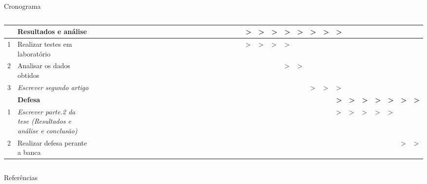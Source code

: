 \begin{frame}[c]{Cronograma}
\begin{columns}
\begin{table}[]
\begin{tabular}{llllllllllllll|llllllllllll|llllllllllll}
     & \textbf{Resultados e análise} &  &  &  &  &  &  &  &  &  &  &  &  &  &  &  &  &  &  &  &  &  &  & \textbf{\textgreater{}} & \textbf{\textgreater{}} & \textbf{\textgreater{}} & \textbf{\textgreater{}} & \textbf{\textgreater{}} & \textbf{\textgreater{}} & \textbf{\textgreater{}} & \textbf{\textgreater{}} &  &  &  &  &  &  \\ \hline
    1 & Realizar testes em laboratório &  &  &  &  &  &  &  &  &  &  &  &  &  &  &  &  &  &  &  &  &  &  & \textgreater{} & \textgreater{} & \textgreater{} & \textgreater{} &  &  &  &  &  &  &  &  &  &  \\
    2 & Analisar os dados obtidos &  &  &  &  &  &  &  &  &  &  &  &  &  &  &  &  &  &  &  &  &  &  &  &  &  & \textgreater{} & \textgreater{} &  &  &  &  &  &  &  &  &  \\
    3 & {\color[HTML]{3166FF} \textit{Escrever segundo artigo}} &  &  &  &  &  &  &  &  &  &  &  &  &  &  &  &  &  &  &  &  &  &  &  &  &  &  &  & \textgreater{} & \textgreater{} & \textgreater{} &  &  &  &  &  &  \\ \hline
     & \textbf{Defesa} &  &  &  &  &  &  &  &  &  &  &  &  &  &  &  &  &  &  &  &  &  &  &  &  &  &  &  &  &  & \textbf{\textgreater{}} & \textbf{\textgreater{}} & \textbf{\textgreater{}} & \textbf{\textgreater{}} & \textbf{\textgreater{}} & \textbf{\textgreater{}} & \textbf{\textgreater{}} \\ \hline
    1 & {\color[HTML]{3166FF} \textit{Escrever parte.2 da tese (Resultados e análise e conclusão)}} &  &  &  &  &  &  &  &  &  &  &  &  &  &  &  &  &  &  &  &  &  &  &  &  &  &  &  &  &  & \textgreater{} & \textgreater{} & \textgreater{} & \textgreater{} & \textgreater{} &  &  \\
    2 & {\color[HTML]{9A0000} Realizar defesa perante a banca} &  &  &  &  &  &  &  &  &  &  &  &  &  &  &  &  &  &  &  &  &  &  &  &  &  &  &  &  &  &  &  &  &  &  & \textgreater{} & \textgreater{}
    \end{tabular}
    \end{table}
    \end{columns}

\end{frame}
\begin{frame}[c]{Referências}
    \centering
    
\end{frame}
